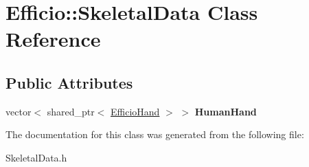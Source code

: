 \hypertarget{class_efficio_1_1_skeletal_data}{}\section{Efficio\+:\+:Skeletal\+Data Class Reference}
\label{class_efficio_1_1_skeletal_data}
\subsection*{Public Attributes}
\begin{DoxyCompactItemize}
\item 
\hypertarget{class_efficio_1_1_skeletal_data_a851f7102d47a74a365895197f8dd55ad}{}\label{class_efficio_1_1_skeletal_data_a851f7102d47a74a365895197f8dd55ad} 
vector$<$ shared\+\_\+ptr$<$ \hyperlink{class_efficio_1_1_efficio_hand}{Efficio\+Hand} $>$ $>$ {\bfseries Human\+Hand}
\end{DoxyCompactItemize}


The documentation for this class was generated from the following file\+:\begin{DoxyCompactItemize}
\item 
Skeletal\+Data.\+h\end{DoxyCompactItemize}
